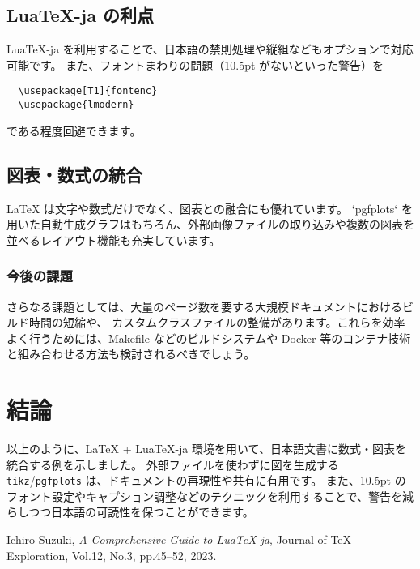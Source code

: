 \documentclass[a4paper,10.5pt]{ltjsarticle}
\begin{document}
\subsection{Lua\TeX-ja の利点}
Lua\TeX-ja を利用することで、日本語の禁則処理や縦組などもオプションで対応可能です。
また、フォントまわりの問題（10.5pt がないといった警告）を 
\begin{verbatim}
  \usepackage[T1]{fontenc}
  \usepackage{lmodern}
\end{verbatim}
である程度回避できます。

\subsection{図表・数式の統合}
LaTeX は文字や数式だけでなく、図表との融合にも優れています。
`pgfplots` を用いた自動生成グラフはもちろん、外部画像ファイルの取り込みや複数の図表を並べるレイアウト機能も充実しています。

\subsubsection{今後の課題}
さらなる課題としては、大量のページ数を要する大規模ドキュメントにおけるビルド時間の短縮や、
カスタムクラスファイルの整備があります。これらを効率よく行うためには、Makefile などのビルドシステムや
Docker 等のコンテナ技術と組み合わせる方法も検討されるべきでしょう。

\section{結論}
以上のように、LaTeX + LuaTeX-ja 環境を用いて、日本語文書に数式・図表を統合する例を示しました。  
外部ファイルを使わずに図を生成する \texttt{tikz}/\texttt{pgfplots} は、ドキュメントの再現性や共有に有用です。  
また、10.5pt のフォント設定やキャプション調整などのテクニックを利用することで、警告を減らしつつ日本語の可読性を保つことができます。

\clearpage
{}
\begin{thebibliography}{99}

Ichiro Suzuki,
\textit{A Comprehensive Guide to LuaTeX-ja},
Journal of TeX Exploration, Vol.12, No.3, pp.45--52, 2023.

\end{thebibliography}
\end{document}
